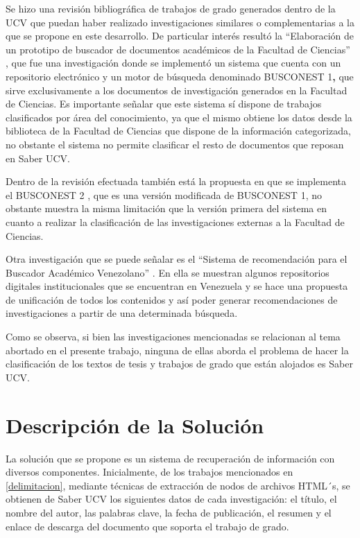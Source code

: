 \documentclass[
  12pt,
  openany]{book}
\begin{document}
Se hizo una revisión bibliográfica de trabajos de grado generados dentro de la UCV que puedan haber realizado investigaciones similares o complementarias a la que se propone en este desarrollo. De particular interés resultó la ``Elaboración de un prototipo de buscador de documentos académicos de la Facultad de Ciencias'' \citep{sanchez2008}, que fue una investigación donde se implementó un sistema que cuenta con un repositorio electrónico y un motor de búsqueda denominado BUSCONEST 1\textbf{,} que sirve exclusivamente a los documentos de investigación generados en la Facultad de Ciencias. Es importante señalar que este sistema sí dispone de trabajos clasificados por área del conocimiento, ya que el mismo obtiene los datos desde la biblioteca de la Facultad de Ciencias que dispone de la información categorizada, no obstante el sistema no permite clasificar el resto de documentos que reposan en Saber UCV.

Dentro de la revisión efectuada también está la propuesta en que se implementa el BUSCONEST 2 \citep{guevara2015}, que es una versión modificada de BUSCONEST 1, no obstante muestra la misma limitación que la versión primera del sistema en cuanto a realizar la clasificación de las investigaciones externas a la Facultad de Ciencias.

Otra investigación que se puede señalar es el ``Sistema de recomendación para el Buscador Académico Venezolano'' \citep{rodriguezlaguna2016}. En ella se muestran algunos repositorios digitales institucionales que se encuentran en Venezuela y se hace una propuesta de unificación de todos los contenidos y así poder generar recomendaciones de investigaciones a partir de una determinada búsqueda.

Como se observa, si bien las investigaciones mencionadas se relacionan al tema abortado en el presente trabajo, ninguna de ellas aborda el problema de hacer la clasificación de los textos de tesis y trabajos de grado que están alojados es Saber UCV.

\hypertarget{descripcion}{%
\section{Descripción de la Solución}\label{descripcion}}

La solución que se propone es un sistema de recuperación de información con diversos componentes. Inicialmente, de los trabajos mencionados en \ref{delimitacion}, mediante técnicas de extracción de nodos de archivos HTML´s, se obtienen de Saber UCV los siguientes datos de cada investigación: el título, el nombre del autor, las palabras clave, la fecha de publicación, el resumen y el enlace de descarga del documento que soporta el trabajo de grado.
\end{document}
